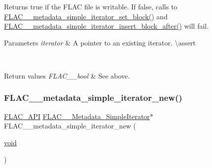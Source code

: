 Returns {\ttfamily true} if the F\+L\+AC file is writable. If {\ttfamily false}, calls to \mbox{\hyperlink{group__flac__metadata__level1_ga7d1ceb2db292c968ae6ac18ecb15c356}{F\+L\+A\+C\+\_\+\+\_\+metadata\+\_\+simple\+\_\+iterator\+\_\+set\+\_\+block()}} and \mbox{\hyperlink{group__flac__metadata__level1_ga1239ccc5ae1dc3f7cb0e1a61707fafc6}{F\+L\+A\+C\+\_\+\+\_\+metadata\+\_\+simple\+\_\+iterator\+\_\+insert\+\_\+block\+\_\+after()}} will fail.


\begin{DoxyParams}{Parameters}
{\em iterator} & A pointer to an existing iterator. \textbackslash{}assert 
\begin{DoxyCode}{1}
\end{DoxyCode}
 \\
\hline
\end{DoxyParams}

\begin{DoxyRetVals}{Return values}
{\em F\+L\+A\+C\+\_\+\+\_\+bool} & See above. \\
\hline
\end{DoxyRetVals}
\mbox{\label{group__flac__metadata__level1_ga5b32f4eba211e05727428e9080f4e393}} 
\subsubsection{\texorpdfstring{FLAC\_\_metadata\_simple\_iterator\_new()}{FLAC\_\_metadata\_simple\_iterator\_new()}}
{\footnotesize\ttfamily \mbox{\hyperlink{group__flac__export_ga56ca07df8a23310707732b1c0007d6f5}{F\+L\+A\+C\+\_\+\+A\+PI}} \mbox{\hyperlink{group__flac__metadata__level1_ga6accccddbb867dfc2eece9ee3ffecb3a}{F\+L\+A\+C\+\_\+\+\_\+\+Metadata\+\_\+\+Simple\+Iterator}}$\ast$ F\+L\+A\+C\+\_\+\+\_\+metadata\+\_\+simple\+\_\+iterator\+\_\+new (\begin{DoxyParamCaption}\item[{\mbox{\hyperlink{_s_d_l__opengles2__gl2ext_8h_ae5d8fa23ad07c48bb609509eae494c95}{void}}}]{ }\end{DoxyParamCaption})}

